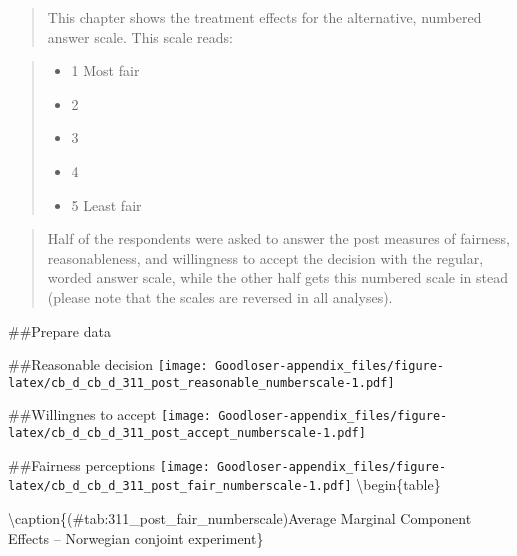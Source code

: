 \documentclass[
]{book}
\providecommand{\tightlist}{%
  \setlength{\itemsep}{0pt}\setlength{\parskip}{0pt}}
\begin{document}
\begin{quote}
This chapter shows the treatment effects for the alternative, numbered answer scale. This scale reads:
\end{quote}

\begin{quote}
\begin{itemize}
\tightlist
\item
  1 Most fair\\
\item
  2\\
\item
  3\\
\item
  4\\
\item
  5 Least fair
\end{itemize}
\end{quote}

\begin{quote}
Half of the respondents were asked to answer the post measures of fairness, reasonableness, and willingness to accept the decision with the regular, worded answer scale, while the other half gets this numbered scale in stead (please note that the scales are reversed in all analyses).
\end{quote}

\#\#Prepare data

\#\#Reasonable decision
\texttt{[image: Goodloser-appendix\_files/figure-latex/cb\_d\_cb\_d\_311\_post\_reasonable\_numberscale-1.pdf]}

\#\#Willingnes to accept
\texttt{[image: Goodloser-appendix\_files/figure-latex/cb\_d\_cb\_d\_311\_post\_accept\_numberscale-1.pdf]}

\#\#Fairness perceptions
\texttt{[image: Goodloser-appendix\_files/figure-latex/cb\_d\_cb\_d\_311\_post\_fair\_numberscale-1.pdf]} \textbackslash begin\{table\}

\textbackslash caption\{(\#tab:311\_post\_fair\_numberscale)Average Marginal Component Effects -- Norwegian conjoint experiment\}
\centering
\end{document}
